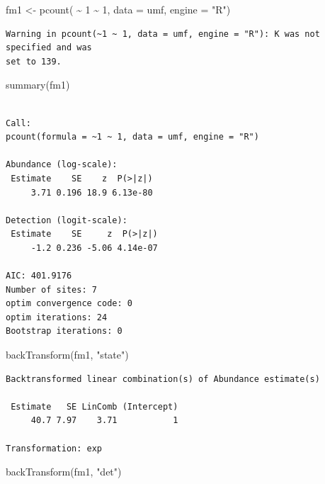 \documentclass[
  letterpaper,
  DIV=11,
  numbers=noendperiod]{scrartcl}
\newenvironment{Shaded}{\begin{snugshade}}{\end{snugshade}}
\newcommand{\AttributeTok}[1]{\textcolor[rgb]{0.40,0.45,0.13}{#1}}
\newcommand{\DecValTok}[1]{\textcolor[rgb]{0.68,0.00,0.00}{#1}}
\newcommand{\FunctionTok}[1]{\textcolor[rgb]{0.28,0.35,0.67}{#1}}
\newcommand{\NormalTok}[1]{\textcolor[rgb]{0.00,0.23,0.31}{#1}}
\newcommand{\OtherTok}[1]{\textcolor[rgb]{0.00,0.23,0.31}{#1}}
\newcommand{\SpecialCharTok}[1]{\textcolor[rgb]{0.37,0.37,0.37}{#1}}
\newcommand{\StringTok}[1]{\textcolor[rgb]{0.13,0.47,0.30}{#1}}
\begin{document}
\begin{Shaded}
\begin{Highlighting}[]
\NormalTok{fm1 }\OtherTok{\textless{}{-}} \FunctionTok{pcount}\NormalTok{( }\SpecialCharTok{\textasciitilde{}} \DecValTok{1} \SpecialCharTok{\textasciitilde{}} \DecValTok{1}\NormalTok{, }
               \AttributeTok{data =}\NormalTok{ umf, }
               \AttributeTok{engine =} \StringTok{"R"}\NormalTok{)}
\end{Highlighting}
\end{Shaded}

\begin{verbatim}
Warning in pcount(~1 ~ 1, data = umf, engine = "R"): K was not specified and was
set to 139.
\end{verbatim}

\begin{Shaded}
\begin{Highlighting}[]
\FunctionTok{summary}\NormalTok{(fm1)}
\end{Highlighting}
\end{Shaded}

\begin{verbatim}

Call:
pcount(formula = ~1 ~ 1, data = umf, engine = "R")

Abundance (log-scale):
 Estimate    SE    z  P(>|z|)
     3.71 0.196 18.9 6.13e-80

Detection (logit-scale):
 Estimate    SE     z  P(>|z|)
     -1.2 0.236 -5.06 4.14e-07

AIC: 401.9176 
Number of sites: 7
optim convergence code: 0
optim iterations: 24 
Bootstrap iterations: 0 
\end{verbatim}

\begin{Shaded}
\begin{Highlighting}[]
\FunctionTok{backTransform}\NormalTok{(fm1, }\StringTok{"state"}\NormalTok{)}
\end{Highlighting}
\end{Shaded}

\begin{verbatim}
Backtransformed linear combination(s) of Abundance estimate(s)

 Estimate   SE LinComb (Intercept)
     40.7 7.97    3.71           1

Transformation: exp 
\end{verbatim}

\begin{Shaded}
\begin{Highlighting}[]
\FunctionTok{backTransform}\NormalTok{(fm1, }\StringTok{"det"}\NormalTok{)}
\end{Highlighting}
\end{Shaded}
\end{document}

